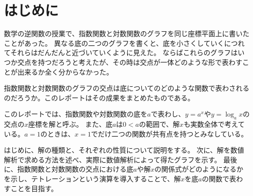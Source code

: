 \section{はじめに}

	数学の逆関数の授業で、指数関数と対数関数のグラフを同じ座標平面上に書いたことがあった。
	異なる底の二つのグラフを書くと、底を小さくしていくにつれてそれらはだんだんと近づいていくように見えた。
	ならばこれらのグラフはいつか交点を持つだろうと考えたが、その時は交点が一体どのような形で表わすことが出来るか全く分からなかった。
	
	指数関数と対数関数のグラフの交点は底についてのどのような関数で表わされるのだろうか。このレポートはその成果をまとめたものである。

	このレポートでは、指数関数や対数関数の底を$a$で表わし、$y=a^x$や$y=\log_a x$の交点の$x$座標を解と呼ぶ。
	また、底$a$は$0 < a$の範囲で、解$x$も実数全体で考えている。$a=1$のときは、$x=1$でだけ二つの関数が共有点を持つとみなしている。
	
	はじめに、解の種類と、それぞれの性質について説明をする。
	次に、解を数値解析で求める方法を述べ、実際に数値解析によって得たグラフを示す。
	最後に、指数関数と対数関数の交点における底$a$や解$x$の関係式がどのようになるかを示し、テトレーションという演算を導入することで、解$x$を底$a$の関数で表わすことを目指す。
	